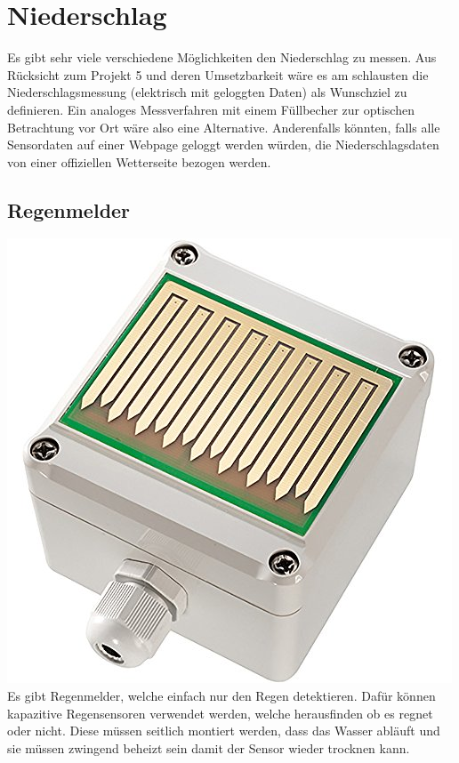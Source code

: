 \section{Niederschlag}
Es gibt sehr viele verschiedene Möglichkeiten den Niederschlag zu messen. Aus Rücksicht zum Projekt 5 und deren Umsetzbarkeit wäre es am schlausten die Niederschlagsmessung (elektrisch mit geloggten Daten) als Wunschziel zu definieren. Ein analoges Messverfahren mit einem Füllbecher zur optischen Betrachtung vor Ort wäre also eine Alternative. Anderenfalls könnten, falls alle Sensordaten auf einer Webpage geloggt werden würden, die Niederschlagsdaten von einer offiziellen Wetterseite bezogen werden.
\subsection{Regenmelder}
\begin{multicols}{2}
{ \centering
\includegraphics[width=0.4\columnwidth]{graphics/regenmelder.jpg}\\
\label{regenmelder}
}
\columnbreak
Es gibt Regenmelder, welche einfach nur den Regen detektieren. Dafür können kapazitive Regensensoren verwendet werden, welche herausfinden ob es regnet oder nicht. Diese müssen seitlich montiert werden, dass das Wasser abläuft und sie müssen zwingend beheizt sein damit der Sensor wieder trocknen kann. \cite[S.51]{Hesse2014} 
\end{multicols}

